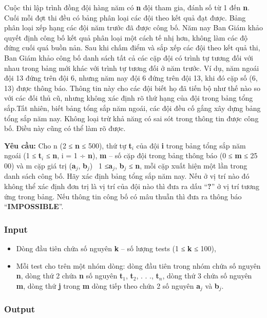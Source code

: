 

Cuộc thi lập trình đồng đội hàng năm có \textbf{n} đội tham gia, đánh số từ 1 đến \textbf{n}. Cuối mỗi đợt thi đều có bảng phân loại các đội theo kết quả đạt được. Bảng phân loại xếp hạng các đội năm trước đã được công bố. Năm nay Ban Giám khảo quyết định công bố kết quả phân loại một cách tế nhị hơn, không làm các độ đứng cuối quá buồn nản. Sau khi chấm điểm và sắp xếp các đội theo kết quả thi, Ban Giám khảo công bố danh sách tất cả các cặp đội có trình tự tương đối với nhau trong bảng mới khác với trình tự tương đối ở năm trước. Ví dụ, năm ngoái đội 13 đứng trên đội 6, nhưng năm nay đội 6 đứng trên đội 13, khi đó cặp số (6, 13) được thông báo. Thông tin này cho các đội biết họ đã tiến bộ như thế nào so với các đối thủ cũ, nhưng không xác định rõ thứ hạng của đội trong bảng tổng sắp.Tất nhiên, biết bảng tổng sắp năm ngoái, các đội đều cố gắng xây dựng bảng tổng sắp năm nay. Không loại trừ khả năng có sai sót trong thông tin được công bố. Điều này cũng có thể làm rõ được.

\textbf{Yêu cầu:} Cho n (2 ≤ \textbf{n} ≤ 500), thứ tự \textbf{t$_i$} của đội \textbf{i} trong bảng tổng sắp năm ngoái (1 ≤ \textbf{t$_i$} ≤ \textbf{n}, i = 1 ÷ \textbf{n}), \textbf{m} – số cặp đội trong bảng thông báo (0 ≤ \textbf{m} ≤ 25 00) và m cặp giá trị (\textbf{a$_j$}, \textbf{b$_j$})  1 ≤\textbf{a$_j$}, \textbf{b$_j$} ≤ \textbf{n}, mỗi cặp xuất hiện một lần trong danh sách công bố. Hãy xác định bảng tổng sắp năm nay. Nếu ở vị trí nào đó không thể xác định đơn trị là vị trí của đội nào thì đưa ra dấu “\textbf{?}” ở vị trí tương ứng trong bảng. Nếu thông tin công bố có mâu thuẫn thì đưa ra thông báo “\textbf{IMPOSSIBLE}”.

\subsubsection{Input}
\begin{itemize}
	\item Dòng đầu tiên chứa số nguyên \textbf{k} – số lượng tests (1 ≤ \textbf{k} ≤ 100),
	\item Mỗi test cho trên một nhóm dòng: dòng đầu tiên trong nhóm chứa số nguyên \textbf{n}, dòng thứ 2 chứa \textbf{n} số nguyên \textbf{t$_1$}, \textbf{t$_2$}, . . ., \textbf{t$_n$}, dòng thứ 3 chứa số nguyên \textbf{m}, dòng thứ \textbf{j} trong \textbf{m} dòng tiếp theo chứa 2 số nguyên \textbf{a$_j$} và \textbf{b$_j$}.
\end{itemize}

\subsubsection{Output}

